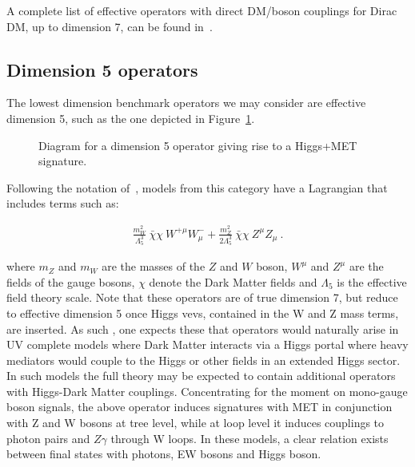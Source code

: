 
A complete list of effective operators with direct DM/boson couplings for
Dirac DM, up to dimension 7, can be found in~\cite{Cotta:2012nj}.

\subsection{Dimension 5 operators}

The lowest dimension benchmark operators we may consider are effective dimension 5,
such as the one depicted in Figure~\ref{fig:modelMonoHEFT}.  

\begin{figure}[!htb]
	\centering
	\textwidth
	\begin{feynmandiagram}[modelMonoHEFT]
	\end{feynmandiagram}
	\caption{Diagram for a dimension 5 operator giving rise to a Higgs+MET signature.}
	\label{fig:modelMonoHEFT}
\end{figure}

Following the notation of~\cite{Carpenter:2012rg},  models
from this category have a Lagrangian that includes terms such as:

\begin{eqnarray}
\frac{m_W^2}{\Lambda_5^3} ~\bar{\chi} \chi ~W^{+ \mu} W^{-}_\mu
+ \frac{m_Z^2}{2 \Lambda_5^3} ~ \bar{\chi} \chi ~ Z^\mu Z_\mu ~.
\end{eqnarray}

where $m_Z$ and $m_W$ are the masses of the $Z$ and $W$ boson, $W^{\mu}$ and $Z^{\mu}$
are the fields of the gauge bosons, $\chi$ denote the Dark Matter fields
and $\Lambda_5$ is the effective field theory scale.  Note that these operators are of true dimension 7, 
but reduce to effective dimension 5 once Higgs vevs, contained in the W and Z mass terms, are inserted.  
As such , one expects  these that operators would naturally  arise in UV complete models where Dark Matter 
interacts via a Higgs portal where heavy mediators would couple to the Higgs or other fields in an extended Higgs sector. 
In such models the full theory may be expected to contain additional operators with Higgs-Dark Matter couplings. 
Concentrating  for the moment on mono-gauge boson signals, the above operator induces signatures with 
MET in conjunction with Z and W bosons at tree level,
while at loop level it induces couplings to photon pairs and $Z \gamma$ through W loops.
In these models, a clear relation exists between final states with photons, EW bosons
and Higgs boson. 

